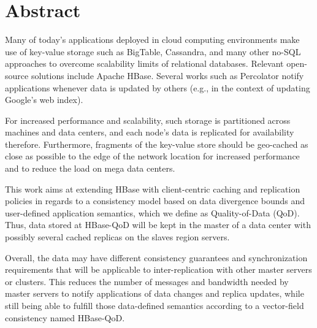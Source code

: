 \cleardoublepage




\chapter*{Abstract}
\thispagestyle{empty}

Many of today's applications deployed in cloud computing environments make use of key-value storage such as BigTable, Cassandra, and many other no-SQL approaches to overcome scalability limits of relational databases. Relevant open-source solutions include Apache HBase. Several works such as Percolator notify applications whenever data is updated by others (e.g., in the context of updating Google's web index).

For increased performance and scalability, such storage is partitioned across machines and data centers, and each node's data is replicated for availability therefore. Furthermore, fragments of the key-value store should be geo-cached as close as possible to the edge of the network location for increased performance and to reduce the load on mega data centers.

This work aims at extending HBase with client-centric caching and replication policies in regards to a consistency model based on data divergence bounds and user-defined application semantics, which we define as Quality-of-Data (QoD). Thus, data stored at HBase-QoD will be kept in the master of a data center with possibly several cached replicas on the slaves region servers.

Overall, the data may have different consistency guarantees and synchronization requirements that will be applicable to inter-replication with other master servers or clusters. This reduces the number of messages and bandwidth needed by master servers to notify applications of data changes and replica updates, while still being able to fulfill those data-defined semantics according to a vector-field consistency named HBase-QoD.

